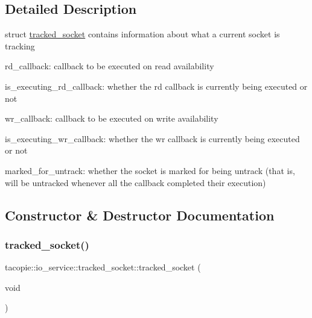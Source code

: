 \subsection{Detailed Description}
struct \hyperlink{structtacopie_1_1io__service_1_1tracked__socket}{tracked\+\_\+socket} contains information about what a current socket is tracking
\begin{DoxyItemize}
\item rd\+\_\+callback\+: callback to be executed on read availability
\item is\+\_\+executing\+\_\+rd\+\_\+callback\+: whether the rd callback is currently being executed or not
\item wr\+\_\+callback\+: callback to be executed on write availability
\item is\+\_\+executing\+\_\+wr\+\_\+callback\+: whether the wr callback is currently being executed or not
\item marked\+\_\+for\+\_\+untrack\+: whether the socket is marked for being untrack (that is, will be untracked whenever all the callback completed their execution) 
\end{DoxyItemize}

\subsection{Constructor \& Destructor Documentation}
\mbox{\label{structtacopie_1_1io__service_1_1tracked__socket_aa2bb26f180847ad15e09f303a2adc9ee}} 
\subsubsection{\texorpdfstring{tracked\+\_\+socket()}{tracked\_socket()}}
{\footnotesize\ttfamily tacopie\+::io\+\_\+service\+::tracked\+\_\+socket\+::tracked\+\_\+socket (\begin{DoxyParamCaption}\item[{void}]{ }\end{DoxyParamCaption})\hspace{0.3cm}{\ttfamily [inline]}}



